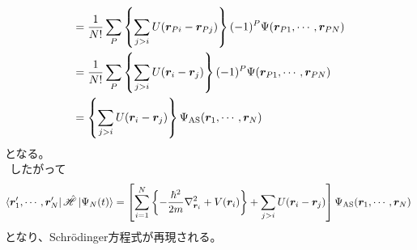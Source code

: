 \documentclass[dvipdfmx, 11pt, a4paper]{jsarticle}
\theoremstyle{definition}
\numberwithin{equation}{section}
\begin{document}
\begin{derivationBox}
\begin{align}
            &= \frac{1}{N!}\sum_P \left\{ \sum_{j> i}U(\bm{r}_{Pi}-\bm{r}_{Pj}) \right\} (-1)^P \Psi(\bm{r}_{P1},\cdots,\bm{r}_{PN})  \notag \\
            &= \frac{1}{N!}\sum_P \left\{ \sum_{j> i}U(\bm{r}_{i}-\bm{r}_{j}) \right\} (-1)^P \Psi(\bm{r}_{P1},\cdots,\bm{r}_{PN}) \notag \\
            &= \left\{ \sum_{j> i}U(\bm{r}_{i}-\bm{r}_{j}) \right\}\Psi_{\text{AS}}(\bm{r}_1,\cdots,\bm{r}_N)
        \end{align}
        となる。\\
        $\ \ $したがって
        \begin{align}
            \bra{\bm{r}'_1,\cdots,\bm{r}'_N} \hat{\mathscr{H}} \ket{\Psi_N(t)} = \left[ \sum_{i=1}^N \left\{ -\frac{\hbar^2}{2m}\nabla^2_{\bm{r}_i} + V(\bm{r}_i) \right\} + \sum_{j> i}U(\bm{r}_{i}-\bm{r}_{j}) \right]\Psi_{\text{AS}}(\bm{r}_1,\cdots,\bm{r}_N) 
        \end{align}
        となり、Schrödinger方程式が再現される。
    \end{derivationBox}
\end{document}

